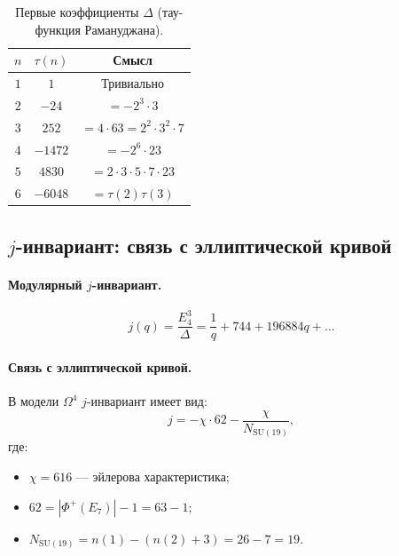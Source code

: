 \documentclass[11pt,a4paper]{article}
\newcommand{\SU}{\mathrm{SU}}
\newcommand{\Om}{\Omega^4}
\theoremstyle{definition}
\begin{document}
\begin{table}[htbp]
\centering
\caption{Первые коэффициенты $\Delta$ (тау-функция Рамануджана).}
\label{tab:modular-tau}
\begin{tabular}{ccc}
\toprule
$n$ & $\tau(n)$ & Смысл \\ 
\midrule
$1$ & $1$ & Тривиально \\[0.3em]
$2$ & $-24$ & $= -2^3 \cdot 3$ \\[0.3em]
$3$ & $252$ & $= 4 \cdot 63 = 2^2 \cdot 3^2 \cdot 7$ \\[0.3em]
$4$ & $-1472$ & $= -2^6 \cdot 23$ \\[0.3em]
$5$ & $4830$ & $= 2 \cdot 3 \cdot 5 \cdot 7 \cdot 23$ \\[0.3em]
$6$ & $-6048$ & $= \tau(2)\tau(3)$ \\ 
\bottomrule
\end{tabular}
\end{table}

\subsection{$j$-инвариант: связь с эллиптической кривой}
\label{subsec:j-invariant-modular}

\paragraph{Модулярный $j$-инвариант.}
\begin{equation}
    j(q) = \frac{E_4^3}{\Delta} = \frac{1}{q} + 744 + 196884 q + \ldots
\end{equation}

\paragraph{Связь с эллиптической кривой.}
В модели $\Om$ $j$-инвариант имеет вид:
\begin{equation}
    \boxed{
    j = -\chi \cdot 62 - \frac{\chi}{N_{\SU(19)}},
    }
    \label{eq:j-invariant-model}
\end{equation}
где:
\begin{itemize}
    \item $\chi = 616$ — эйлерова характеристика;
    \item $62 = |\Phi^+(E_7)| - 1 = 63 - 1$;
    \item $N_{\SU(19)} = n(1) - (n(2) + 3) = 26 - 7 = 19$.
\end{itemize}
\end{document}
